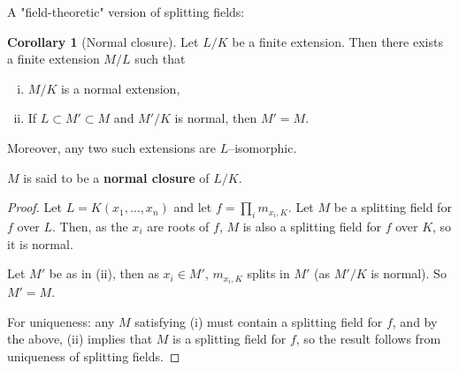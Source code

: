\documentclass{article}
\theoremstyle{definition}
\newtheorem{cor}[theorem]{Corollary}
\begin{document}
A "field-theoretic" version of splitting fields:
\begin{cor}[Normal closure]
    Let $L/K$ be a finite extension. Then there exists a finite extension $M/L$ such that 
    \begin{enumerate}[(i)]
        \item $M/K$ is a normal extension,
        \item If $L \subset M' \subset M$ and $M'/K$ is normal, then $M'=M$.
    \end{enumerate}
    Moreover, any two such extensions are $L$--isomorphic.
\end{cor}
$M$ is said to be a \textbf{normal closure} of $L/K$.
\begin{proof}
    Let $L=K(x_1,\ldots,x_n)$ and let $f = \prod_{i}^{} m_{x_i,K}$. Let $M$ be a splitting field for $f$ over $L$. Then, as the $x_i$ are roots of $f$, $M$ is also a splitting field for $f$ over $K$, so it is normal.

    Let $M'$ be as in (ii), then as $x_i \in M'$, $m_{x_i,K}$ splits in $M'$ (as $M'/K$ is normal). So $M'=M$.
    \vspace{1mm}
    
    For uniqueness: any $M$ satisfying (i) must contain a splitting field for $f$, and by the above, (ii) implies that $M$ is a splitting field for $f$, so the result follows from uniqueness of splitting fields.
\end{proof}
\end{document}
